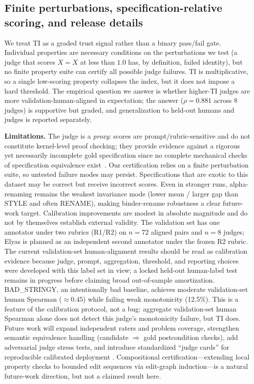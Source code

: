 \documentclass{article}
\begin{document}
\subsection{Finite perturbations, specification-relative scoring, and release details}
We treat TI as a graded trust signal rather than a binary pass/fail gate.
Individual properties are necessary conditions on the perturbations we test (a judge that scores \(X=X\) at less than \(1.0\) has, by definition, failed identity), but no finite property suite can certify all possible judge failures.
TI is multiplicative, so a single low-scoring property collapses the index, but it does not impose a hard threshold.
The empirical question we answer is whether higher-TI judges are more validation-human-aligned in expectation; the answer (\(\rho=0.881\) across \(8\) judges) is supportive but graded, and generalization to held-out humans and judges is reported separately.

\textbf{Limitations.} The judge is a \emph{proxy}: scores are prompt/rubric-sensitive and do not constitute kernel-level proof checking; they provide evidence against a rigorous yet necessarily incomplete gold specification since no complete mechanical checks of specification equivalence exist~\citep{rice1953}.
Our certification relies on a finite perturbation suite, so untested failure modes may persist. Specifications that are exotic to this dataset may be correct but receive incorrect scores.
Even in stronger runs, alpha-renaming remains the weakest invariance mode (lower mean / larger gap than STYLE and often RENAME), making binder-rename robustness a clear future-work target.
Calibration improvements are modest in absolute magnitude and do not by themselves establish external validity.
The validation set has one annotator under two rubrics (R1/R2) on \(n=72\) aligned pairs and \(n=8\) judges; Elyas is planned as an independent second annotator under the frozen R2 rubric.
The current validation-set human-alignment results should be read as calibration evidence because judge, prompt, aggregation, threshold, and reporting choices were developed with this label set in view; a locked held-out human-label test remains in progress before claiming broad out-of-sample amortization.
BAD\_STRINGY, an intentionally bad baseline, achieves moderate validation-set human Spearman (\(\approx0.45\)) while failing weak monotonicity (12.5\%).
This is a feature of the calibration protocol, not a bug: aggregate validation-set human Spearman alone does not detect this judge's monotonicity failure, but TI does.
Future work will expand independent raters and problem coverage, strengthen semantic equivalence handling (candidate $\Rightarrow$ gold postcondition checks), add adversarial judge stress tests, and introduce standardized ``judge cards'' for reproducible calibrated deployment \citep{zhou2025graders}.
Compositional certification---extending local property checks to bounded edit sequences via edit-graph induction---is a natural future-work direction, but not a claimed result here.
\end{document}
